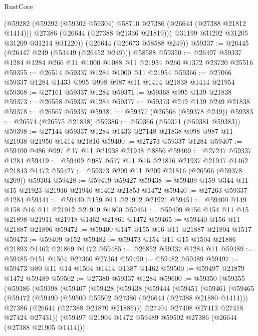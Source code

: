 \begin{lexlean}{RustCore}
\begin{coremodule}
        (@59282
          (@59292 (@59302 @59304) @58710 @27386 (@26644 (@27388 @21812 @1414)))
          @27386
          (@26644 (@27388 @21336 @21819)))
        @31199
        @31202
        @31205
        @31209
        @31214
        @31220))
    (@26644 (@26673 @58588 @249))
@59337 := @26445 (@26447 @249 (@53449 (@26452 @249))) @58588
@59350 := @26497 @59337 @1284 @1284 @266 @11 @1000 @1088 @11 @21954 @266 @1372 @23720 @25516
@59355 := @26514 @59337 @1284 @1000 @11 @21954
@59366 := @27066 @59337 @1284 @1433 @995 @998 @987 @11 @1414 @21838 @1414 @21954
@59368 := @27161 @59337 @1284
@59371 := @59368 @995 @139 @21838
@59373 := @26558 @59337 @1284
@59377 := @59373 @249 @139 @249 @21838
@59378 := @26567 @59337
@59381 := @59377 (@26566 (@59378 @249))
@59383 := @26574 (@26575 @21838)
@59386 := @59366 (@59371 (@59381 @59383))
@59398 := @27144 @59337 @1284 @1433 @27148 @21838 @998 @987 @11 @21938 @21950 @1414 @21816
@59400 := @27273 @59337 @1284
@59407 := @59400 @486 @997 @17 @11 @21938 @21948 @8856
@59409 := @27247 @59337 @1284
@59419 := @59409 @987 @577 @11 @16 @21816 @21937 @21947 @1462 @21843 @1472
@59427 := @59373 @209 @11 @209 @21816 (@26566 (@59378 @209)) @59304
@59428 := @59419 @59427
@59438 := @59409 @159 @344 @11 @15 @21923 @21936 @21946 @1462 @21853 @1472
@59440 := @27263 @59337 @1284
@59444 := @59440 @159 @11 @21912 @21921
@59451 := @59400 @149 @158 @16 @11 @21912 @21919 @1800
@59461 := @59409 @156 @154 @11 @15 @21898 @21911 @21918 @1462 @21861 @1472
@59465 := @59440 @156 @11 @21887 @21896
@59472 := @59400 @147 @155 @16 @11 @21887 @21894 @1517
@59473 := @59409 @152
@59482 := @59473 @154 @11 @15 @1504 @21886 @21893 @1462 @21869 @1472
@59485 := @26852 @59337 @1284 @11
@59489 := @59485 @151 @1504 @27360 @27364
@59490 := @59482 @59489
@59497 := @59473 @80 @11 @14 @1504 @1414 @1387 @1462
@59500 := @59497 @21879 @1472 @59489
@59502 := @27380 @59337 @1284
@59600 := @59350
    (@59355
      (@59386
        (@59398
          (@59407
            (@59428
              (@59438
                (@59444
                  (@59451
                    (@59461
                      (@59465
                        (@59472
                          (@59490
                            (@59500 @59502 @27386 (@26644 (@27388 @21880 @1414)))
                            @27386
                            (@26644 (@27388 @21870 @21886)))
                          @27404
                          @27408
                          @27413
                          @27418
                          @27424
                          @27431))
                      (@59497 @21904 @1472 @59489 @59502 @27386 (@26644 (@27388 @21905 @1414)))

\end{coremodule}
\end{lexlean}
